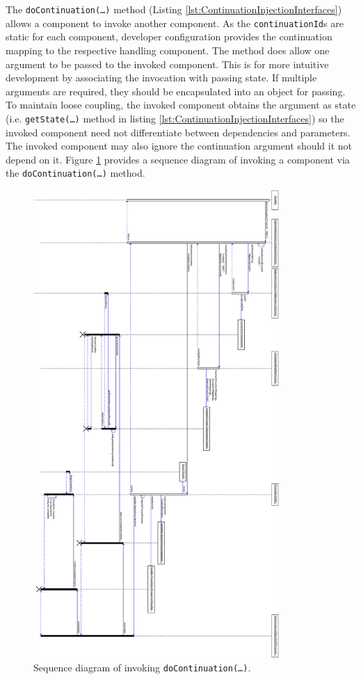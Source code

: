 \documentclass[prodmode]{style/acmlarge}
\begin{document}
The \texttt{doContinuation(\ldots)} method (Listing
\ref{lst:ContinuationInjectionInterfaces}) allows a component to invoke another
component.  As the \texttt{continu\-ationId}s are static for each component,
developer configuration provides the continuation mapping to the respective handling
component.  The method does allow one argument to be passed to the invoked
component.  This is for more intuitive development by associating the invocation
with passing state.  If multiple arguments are required, they should be
encapsulated into an object for passing.  To maintain loose coupling, the
invoked component obtains the argument as state (i.e. \texttt{getState(\ldots)}
method in listing \ref{lst:ContinuationInjectionInterfaces}) so the invoked
component need not differentiate between dependencies and parameters.  The
invoked component may also ignore the continuation argument should it not depend
on it.  Figure \ref{fig:DoContinuationSequenceDiagram} provides a sequence
diagram of invoking a component via the \texttt{doContinuation(\ldots)} method.
  
\begin{figure}[!t]
\centering
\includegraphics[height=7in]{DoContinuationSequenceDiagram}
\caption{Sequence diagram of invoking \texttt{doContinuation(\ldots)}.}
\label{fig:DoContinuationSequenceDiagram}
\end{figure}
 
\end{document}
